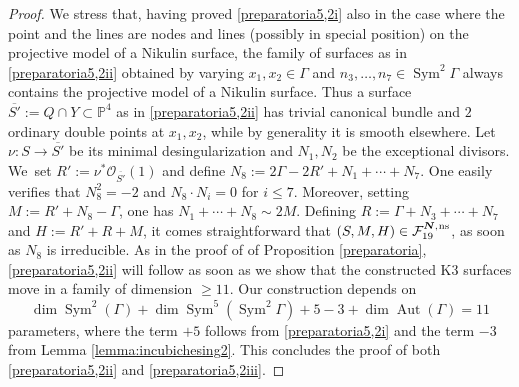 \documentclass[11pt]{article}
\newcommand{\ns}{{\mkern1mu\mathrm{ns}}}
\newcommand{\bN}{\boldsymbol{N}}
\theoremstyle{plain}
\theoremstyle{definition}
\DeclareMathOperator{\Aut}{Aut}
\DeclareMathOperator{\Sym}{Sym}
\newcommand\PP{{\mathbb P}}
\newcommand\F{{\mathcal F}}
\begin{document}
\begin{proof}
We stress that, having proved \eqref{preparatoria5,2i} also in the case where the point and the lines are nodes and lines (possibly in special position) on the projective model of a Nikulin surface, the family of surfaces as in \eqref{preparatoria5,2ii} obtained by varying $x_1,x_2 \in \Gamma$ and $n_3,\ldots,n_7\in \Sym^2\Gamma$ always contains the projective model of a Nikulin surface.
Thus a surface $\overline{S'}:= Q\cap Y\subset \PP^4$ as in \eqref{preparatoria5,2ii} has trivial canonical bundle and $2$ ordinary double points at $x_1,x_2$, while by generality it is smooth elsewhere. Let $\nu:S\to \overline{S'}$ be its minimal desingularization and $N_1,N_2$ be the exceptional divisors. We~set $R':=\nu^*\mathcal O_{\overline{S'}}(1)$ and define $N_8:=2\Gamma-2R'+N_1+\cdots+N_7$. One easily verifies that $N_8^2=-2$ and
$N_8 \cdot N_i=0$ for $i\leq 7$. Moreover, setting $M:=R'+N_8-\Gamma$, one has
$N_1+\cdots+N_8 \sim 2M$. Defining $R:=\Gamma+N_3+\cdots+N_7$ and $H:=R'+R+M$, it comes straightforward that $(S,M,H)\in \F_{19}^{\bN,\ns}$, as soon as $N_8$ is irreducible. As in the proof of of Proposition \ref{preparatoria}, \eqref{preparatoria5,2ii} will
follow as soon as we show that the constructed K3 surfaces move in a family of dimension $\geq 11$. Our construction depends on
\[
\dim\Sym^2(\Gamma)+\dim \Sym^5(\Sym^2\Gamma)+5-3+\dim \Aut(\Gamma)=11
\]
parameters, where the term $+5$ follows from \eqref{preparatoria5,2i} and the term $-3$ from Lemma \ref{lemma:incubichesing2}. This concludes the proof of both \eqref{preparatoria5,2ii} and \eqref{preparatoria5,2iii}.
\end{proof}
\end{document}

